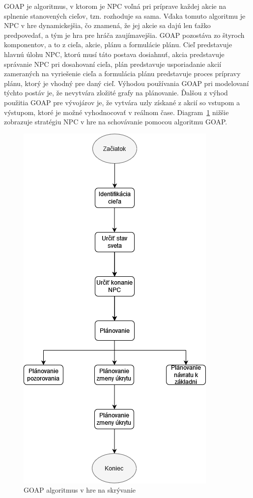 \documentclass[10pt,twoside,slovak,a4paper]{article}
\begin{document}
\begin{itemize}
\quad GOAP je algoritmus, v ktorom je NPC voľná pri príprave každej akcie na splnenie stanovených cieľov, tzn. rozhoduje sa sama. Vďaka tomuto algoritmu je NPC v hre dynamickejšia, čo znamená, že jej akcie sa dajú len ťažko predpovedať, a tým je hra pre hráča zaujímavejšia. GOAP pozostáva zo štyroch komponentov, a to z cieľa, akcie, plánu a formulácie plánu. Cieľ predstavuje hlavnú úlohu NPC, ktorú musí táto postava dosiahnuť, akcia predstavuje správanie NPC pri dosahovaní cieľa, plán predstavuje usporiadanie akcií zameraných na vyriešenie cieľa a formulácia plánu predstavuje proces prípravy plánu, ktorý je vhodný pre daný cieľ.  Výhodou používania GOAP pri modelovaní týchto postáv je, že nevytvára zložité grafy na plánovanie. Ďalšou z výhod použitia GOAP pre vývojárov je, že vytvára uzly získané z akcií so vstupom a výstupom, ktoré je možné vyhodnocovať v reálnom čase. Diagram~\ref{f:d1} nižšie zobrazuje stratégiu NPC v hre na schovávanie pomocou algoritmu GOAP.  \cite{NPC}
\begin{figure}[tbh]
\center\includegraphics[scale=0.5]{diagram1.png}
\caption{GOAP algoritmus v hre na skrývanie}
\label{f:d1}
\end{figure}
\end{itemize}
\end{document}
